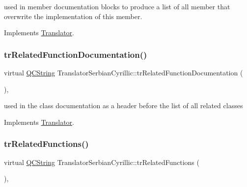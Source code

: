 used in member documentation blocks to produce a list of all member that overwrite the implementation of this member. 

Implements \mbox{\hyperlink{class_translator}{Translator}}.

\mbox{\label{class_translator_serbian_cyrillic_a2e3d8cfd9d451d1bd0a7ee449aadbf2f}} 
\subsubsection{\texorpdfstring{trRelatedFunctionDocumentation()}{trRelatedFunctionDocumentation()}}
{\footnotesize\ttfamily virtual \mbox{\hyperlink{class_q_c_string}{Q\+C\+String}} Translator\+Serbian\+Cyrillic\+::tr\+Related\+Function\+Documentation (\begin{DoxyParamCaption}{ }\end{DoxyParamCaption})\hspace{0.3cm}{\ttfamily [inline]}, {\ttfamily [virtual]}}

used in the class documentation as a header before the list of all related classes 

Implements \mbox{\hyperlink{class_translator}{Translator}}.

\mbox{\label{class_translator_serbian_cyrillic_adc1f4d26bb85ea1be22c2092b2d21783}} 
\subsubsection{\texorpdfstring{trRelatedFunctions()}{trRelatedFunctions()}}
{\footnotesize\ttfamily virtual \mbox{\hyperlink{class_q_c_string}{Q\+C\+String}} Translator\+Serbian\+Cyrillic\+::tr\+Related\+Functions (\begin{DoxyParamCaption}{ }\end{DoxyParamCaption})\hspace{0.3cm}{\ttfamily [inline]}, {\ttfamily [virtual]}}

